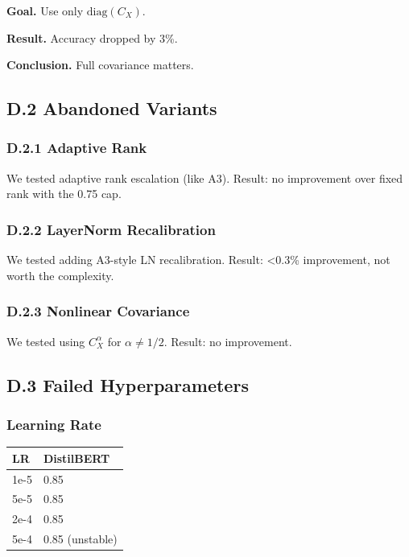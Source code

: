 \textbf{Goal.} Use only $\mathrm{diag}(C_X)$.

\textbf{Result.} Accuracy dropped by 3\%.

\textbf{Conclusion.} Full covariance matters.

\subsection{D.2 Abandoned Variants}

\subsubsection{D.2.1 Adaptive Rank}

We tested adaptive rank escalation (like A3). Result: no improvement over 
fixed rank with the 0.75 cap.

\subsubsection{D.2.2 LayerNorm Recalibration}

We tested adding A3-style LN recalibration. Result: \textless{}0.3\% improvement, not 
worth the complexity.

\subsubsection{D.2.3 Nonlinear Covariance}

We tested using $C_X^\alpha$ for $\alpha \neq 1/2$. Result: no improvement.

\subsection{D.3 Failed Hyperparameters}

\subsubsection{Learning Rate}

\begin{table}[H]
\centering
\small
\begin{tabular}{ll}
\toprule
\textbf{LR} & \textbf{DistilBERT} \\
\midrule
1e-5 & 0.85 \\
5e-5 & 0.85 \\
2e-4 & 0.85 \\
5e-4 & 0.85 (unstable) \\
\bottomrule
\end{tabular}
\end{table}


